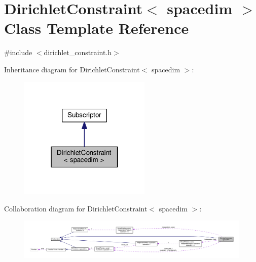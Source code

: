 \hypertarget{class_dirichlet_constraint}{}\section{Dirichlet\+Constraint$<$ spacedim $>$ Class Template Reference}
\label{class_dirichlet_constraint}


{\ttfamily \#include $<$dirichlet\+\_\+constraint.\+h$>$}



Inheritance diagram for Dirichlet\+Constraint$<$ spacedim $>$\+:
\nopagebreak
\begin{figure}[H]
\begin{center}
\leavevmode
\includegraphics[width=178pt]{class_dirichlet_constraint__inherit__graph}
\end{center}
\end{figure}


Collaboration diagram for Dirichlet\+Constraint$<$ spacedim $>$\+:
\nopagebreak
\begin{figure}[H]
\begin{center}
\leavevmode
\includegraphics[width=350pt]{class_dirichlet_constraint__coll__graph}
\end{center}
\end{figure}
